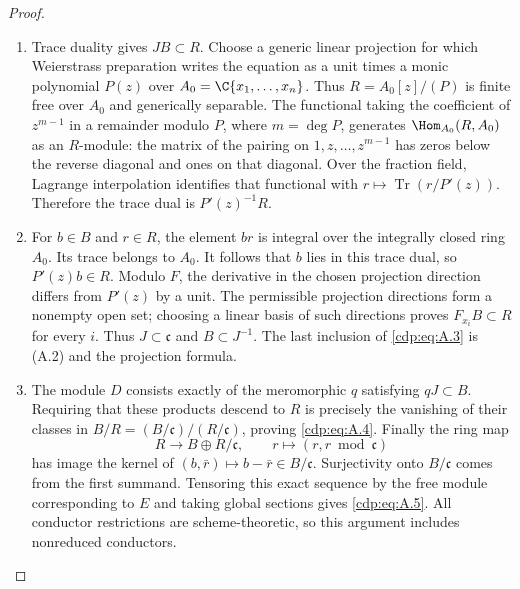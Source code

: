 \begin{proof}

\begin{enumerate}[label={$\langle1\rangle$\arabic*.},leftmargin=*]
\item Trace duality gives $JB\subset R$. Choose a generic linear projection for which Weierstrass preparation writes the equation as a unit times a monic polynomial $P(z)$ over $A_0=\C\{x_1,\ldots,x_n\}$. Thus $R=A_0[z]/(P)$ is finite free over $A_0$ and generically separable. The functional taking the coefficient of $z^{m-1}$ in a remainder modulo $P$, where $m=\deg P$, generates $\Hom_{A_0}(R,A_0)$ as an $R$-module: the matrix of the pairing on $1,z,\ldots,z^{m-1}$ has zeros below the reverse diagonal and ones on that diagonal. Over the fraction field, Lagrange interpolation identifies that functional with $r\mapsto\operatorname{Tr}(r/P'(z))$. Therefore the trace dual is $P'(z)^{-1}R$.

\item For $b\in B$ and $r\in R$, the element $br$ is integral over the integrally closed ring $A_0$. Its trace belongs to $A_0$. It follows that $b$ lies in this trace dual, so $P'(z)b\in R$. Modulo $F$, the derivative in the chosen projection direction differs from $P'(z)$ by a unit. The permissible projection directions form a nonempty open set; choosing a linear basis of such directions proves $F_{x_i}B\subset R$ for every $i$. Thus $J\subset\mathfrak c$ and $B\subset J^{-1}$. The last inclusion of \eqref{cdp:eq:A.3} is (A.2) and the projection formula.

\item The module $D$ consists exactly of the meromorphic $q$ satisfying $qJ\subset B$. Requiring that these products descend to $R$ is precisely the vanishing of their classes in $B/R=(B/\mathfrak c)/(R/\mathfrak c)$, proving \eqref{cdp:eq:A.4}. Finally the ring map
\[
 R\longrightarrow B\oplus R/\mathfrak c,
 \qquad r\longmapsto(r,r\bmod\mathfrak c)
\]
has image the kernel of $(b,\bar r)\mapsto b-\bar r\in B/\mathfrak c$. Surjectivity onto $B/\mathfrak c$ comes from the first summand. Tensoring this exact sequence by the free module corresponding to $E$ and taking global sections gives \eqref{cdp:eq:A.5}. All conductor restrictions are scheme-theoretic, so this argument includes nonreduced conductors.

\end{enumerate}
\end{proof}
